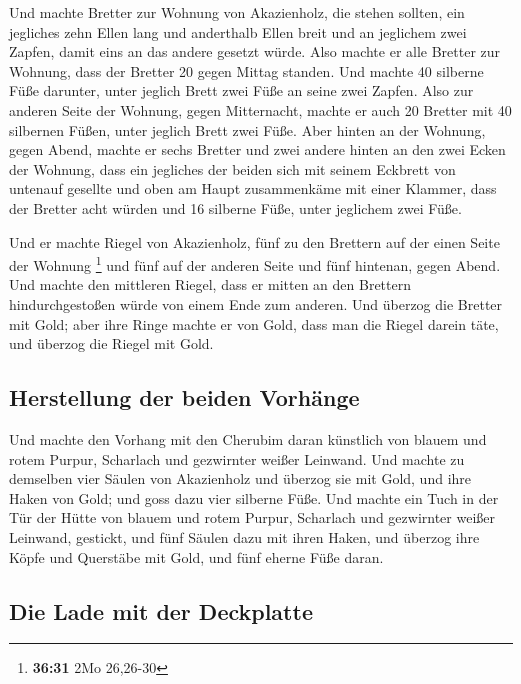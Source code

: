  Und machte Bretter zur Wohnung von Akazienholz, die
stehen sollten,  ein jegliches zehn Ellen lang und
anderthalb Ellen breit  und an jeglichem zwei Zapfen,
damit eins an das andere gesetzt würde. Also machte er alle Bretter zur
Wohnung,  dass der Bretter 20 gegen Mittag standen.
 Und machte 40 silberne Füße darunter, unter jeglich
Brett zwei Füße an seine zwei Zapfen.  Also zur anderen
Seite der Wohnung, gegen Mitternacht, machte er auch 20 Bretter
 mit 40 silbernen Füßen, unter jeglich Brett zwei Füße.
 Aber hinten an der Wohnung, gegen Abend, machte er sechs
Bretter  und zwei andere hinten an den zwei Ecken der
Wohnung,  dass ein jegliches der beiden sich mit seinem
Eckbrett von untenauf gesellte und oben am Haupt zusammenkäme mit einer
Klammer,  dass der Bretter acht würden und 16 silberne
Füße, unter jeglichem zwei Füße.

 Und er machte Riegel von Akazienholz, fünf zu den
Brettern auf der einen Seite der Wohnung \footnote{\textbf{36:31} 2Mo
  26,26-30}  und fünf auf der anderen Seite und fünf
hintenan, gegen Abend.  Und machte den mittleren Riegel,
dass er mitten an den Brettern hindurchgestoßen würde von einem Ende zum
anderen.  Und überzog die Bretter mit Gold; aber ihre
Ringe machte er von Gold, dass man die Riegel darein täte, und überzog
die Riegel mit Gold.

\hypertarget{herstellung-der-beiden-vorhuxe4nge}{%
\subsection{Herstellung der beiden
Vorhänge}\label{herstellung-der-beiden-vorhuxe4nge}}

 Und machte den Vorhang mit den Cherubim daran künstlich
von blauem und rotem Purpur, Scharlach und gezwirnter weißer Leinwand.
 Und machte zu demselben vier Säulen von Akazienholz und
überzog sie mit Gold, und ihre Haken von Gold; und goss dazu vier
silberne Füße.  Und machte ein Tuch in der Tür der Hütte
von blauem und rotem Purpur, Scharlach und gezwirnter weißer Leinwand,
gestickt,  und fünf Säulen dazu mit ihren Haken, und
überzog ihre Köpfe und Querstäbe mit Gold, und fünf eherne Füße daran.

\hypertarget{die-lade-mit-der-deckplatte}{%
\subsection{Die Lade mit der
Deckplatte}\label{die-lade-mit-der-deckplatte}}

